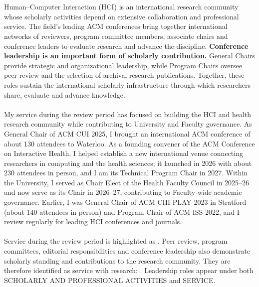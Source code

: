 \documentclass[11pt]{article}
\begin{document}
\sectionbreak
\ifAPR %
\\ \\
Human–Computer Interaction (HCI) is an international research community whose scholarly activities depend on extensive collaboration and professional service. The field's leading ACM conferences bring together international networks of reviewers, program committee members, associate chairs and conference leaders to evaluate research and advance the discipline. \textbf{Conference leadership is an important form of scholarly contribution.} General Chairs provide strategic and organizational leadership, while Program Chairs oversee peer review and the selection of archival research publications. Together, these roles sustain the international scholarly infrastructure through which researchers share, evaluate and advance knowledge.
\\ \\
My service during the review period has focused on building the HCI and health research community while contributing to University and Faculty governance. As General Chair of ACM CUI 2025, I brought an international ACM conference of about 130 attendees to Waterloo. As a founding convener of the ACM Conference on Interactive Health, I helped establish a new international venue connecting researchers in computing and the health sciences; it launched in 2026 with about 230 attendees in person, and I am its Technical Program Chair in 2027. Within the University, I served as Chair Elect of the Health Faculty Council in 2025--26 and now serve as its Chair in 2026--27, contributing to Faculty-wide academic governance. Earlier, I was General Chair of ACM CHI PLAY 2023 in Stratford (about 140 attendees in person) and Program Chair of ACM ISS 2022, and I review regularly for leading HCI conferences and journals.
\\ \\
Service during the review period is highlighted as . Peer review, program committees, editorial responsibilities and conference leadership also demonstrate scholarly standing and contributions to the research community. They are therefore identified as service with research: . Leadership roles appear under both SCHOLARLY AND PROFESSIONAL ACTIVITIES and SERVICE.
\\ \\
\fi %
\keepwithnext
{}
\end{document}
